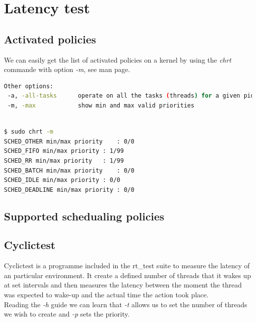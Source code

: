 \documentclass[10pt,a4paper]{article}
\begin{document}
\tableofcontents

\thispagestyle{empty}


\newpage
\section{Latency test}
\subsection{Activated policies}
We can easily get the list of activated policies on a kernel by using the \emph{chrt} commande with option \emph{-m}, see man page.
\begin{lstlisting}[language=bash,caption={chrt man page}]
Other options:
 -a, -all-tasks      operate on all the tasks (threads) for a given pid
 -m, -max            show min and max valid priorities
\end{lstlisting}
\begin{lstlisting}[language=bash,caption={chrt -m result}]

$ sudo chrt -m
SCHED_OTHER min/max priority	: 0/0
SCHED_FIFO min/max priority	: 1/99
SCHED_RR min/max priority	: 1/99
SCHED_BATCH min/max priority	: 0/0
SCHED_IDLE min/max priority	: 0/0
SCHED_DEADLINE min/max priority	: 0/0
\end{lstlisting}
\subsection{Supported schedualing policies}
\subsection{Cyclictest}
Cyclictest is a programme included in the rt\_test suite to measure the latency of an particular environment. It create a defined number of threads that it wakes up at set intervals and then measures the latency between the moment the thread was expected to wake-up and the actual time the action took place.\\
Reading the \emph{-h} guide we can learn that \emph{-t} allows us to set the number of threads we wish to create and \emph{-p} sets the priority. 
\end{document}
